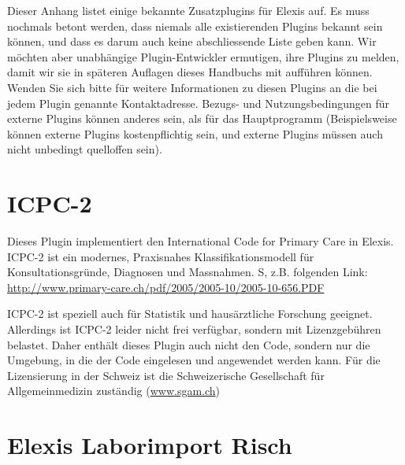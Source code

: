 
Dieser Anhang listet einige bekannte Zusatzplugins für Elexis auf. Es muss nochmals betont werden, dass niemals alle existierenden Plugins bekannt sein können, und dass es darum auch keine abschliessende Liste geben kann. Wir möchten aber unabhängige Plugin-Entwickler ermutigen, ihre Plugins zu melden, damit wir sie in späteren Auflagen dieses Handbuchs mit aufführen können.
Wenden Sie sich bitte für weitere Informationen zu diesen Plugins an die bei jedem Plugin genannte Kontaktadresse. Bezugs- und Nutzungsbedingungen für externe Plugins können anderes sein, als für das Hauptprogramm (Beispielsweise können externe Plugins kostenpflichtig sein, und externe Plugins müssen auch nicht unbedingt quelloffen sein).

\section{ICPC-2}
Dieses Plugin implementiert den International Code for Primary Care in Elexis. ICPC-2 ist ein modernes, Praxisnahes Klassifikationsmodell für Konsultationsgründe, Diagnosen und Massnahmen. S, z.B. folgenden Link:
\href{http://www.primary-care.ch/pdf/2005/2005-10/2005-10-656.PDF}{http://www.primary-care.ch/pdf/2005/2005-10/2005-10-656.PDF}


ICPC-2 ist speziell auch für Statistik und hausärztliche Forschung geeignet. Allerdings ist ICPC-2 leider nicht frei verfügbar, sondern mit Lizenzgebühren belastet. Daher enthält dieses Plugin auch nicht den Code, sondern nur die Umgebung, in die der Code eingelesen und angewendet werden kann. Für die Lizensierung in der Schweiz ist die Schweizerische Gesellschaft für Allgemeinmedizin zuständig (\href{http://www.sgam.ch}{www.sgam.ch})

\section{Elexis Laborimport Risch}


